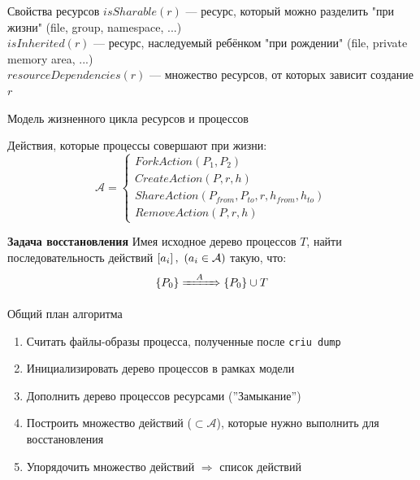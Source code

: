 \begin{frame}{Свойства ресурсов}
\alert{$isSharable(r)$} --- ресурс, который можно разделить "при жизни" (file, group, namespace, ...)\\

\alert{$isInherited(r)$} --- ресурс, наследуемый ребёнком "при рождении" (file, private memory area, ...)\\

\alert{$resourceDependencies(r)$} --- множество ресурсов, от которых зависит создание $r$\\

\end{frame}

\begin{frame}{Модель жизненного цикла ресурсов и процессов}

Действия, которые процессы совершают при жизни:
\begin{equation*}
\mathcal{A} = 
\begin{cases}
ForkAction(P_1, P_2)\\
CreateAction(P, r, h)\\
ShareAction(P_{from}, P_{to}, r, h_{from}, h_{to})\\
RemoveAction(P, r, h)
\end{cases}
\end{equation*}


\begin{block}{\textbf{Задача восстановления}}
Имея исходное дерево процессов $T$, найти последовательность действий $\left[ a_i \right],\ (a_i \in \mathcal{A})$ такую, что:
\begin{equation*}
\left\lbrace P_0 \right\rbrace \xRightarrow{\hspace{1em}A\hspace{1em}} \left\lbrace P_0 \right\rbrace \cup T
\end{equation*}
\end{block}
\end{frame}

\begin{frame}{Общий план алгоритма}
\begin{enumerate}
	\item Считать файлы-образы процесса, полученные после \texttt{criu dump}
	\item Инициализировать дерево процессов в рамках модели
	\item Дополнить дерево процессов ресурсами (''Замыкание'')
	\item Построить множество действий ($\subset \mathcal{A}$), которые нужно выполнить для восстановления
	\item Упорядочить множество действий $\Rightarrow$ список действий
\end{enumerate}
\end{frame}

